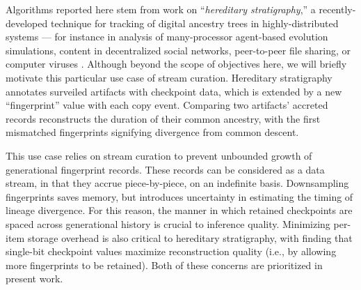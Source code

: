 
Algorithms reported here stem from work on ``\textit{hereditary stratigraphy},'' a recently-developed technique for tracking of digital ancestry trees in highly-distributed systems --- for instance in analysis of many-processor agent-based evolution simulations, content in decentralized social networks, peer-to-peer file sharing, or computer viruses \citep{moreno2022hereditary}.
Although beyond the scope of objectives here, we will briefly motivate this particular use case of stream curation.
Hereditary stratigraphy annotates surveiled artifacts with checkpoint data, which is extended by a new ``fingerprint'' value with each copy event.
Comparing two artifacts' accreted records reconstructs the duration of their common ancestry, with the first mismatched fingerprints signifying divergence from common descent.

This use case relies on stream curation to prevent unbounded growth of generational fingerprint records.
These records can be considered as a data stream, in that they accrue piece-by-piece, on an indefinite basis.
Downsampling fingerprints saves memory, but introduces uncertainty in estimating the timing of lineage divergence.
For this reason, the manner in which retained checkpoints are spaced across generational history is crucial to inference quality.
Minimizing per-item storage overhead is also critical to hereditary stratigraphy, with \citet{moreno2024guide} finding that single-bit checkpoint values maximize reconstruction quality (i.e., by allowing more fingerprints to be retained).
Both of these concerns are prioritized in present work.
